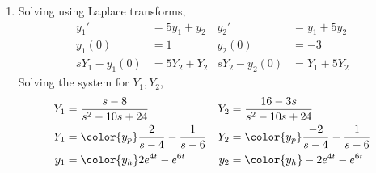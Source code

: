 \begin{enumerate}
    \item Solving using Laplace transforms,
          \begin{align}
              y_1'          & = 5y_1 + y_2 &
              y_2'          & = y_1 + 5y_2   \\
              y_1(0)        & = 1          &
              y_2(0)        & = -3           \\
              sY_1 - y_1(0) & = 5Y_2 +Y_2  &
              sY_2 - y_2(0) & = Y_1 + 5Y_2
          \end{align}
          Solving the system for $ Y_1, Y_2 $,
          \begin{align}
              Y_1 & = \frac{s - 8}{s^2 - 10s + 24}               &
              Y_2 & = \frac{16 - 3s}{s^2 - 10s + 24}               \\
              Y_1 & = \color{y_p} \frac{2}{s-4} - \frac{1}{s-6}  &
              Y_2 & = \color{y_p} \frac{-2}{s-4} - \frac{1}{s-6}   \\
              y_1 & = \color{y_h} 2e^{4t} - e^{6t}               &
              y_2 & = \color{y_h} -2e^{4t} - e^{6t}
          \end{align}


\end{enumerate}
